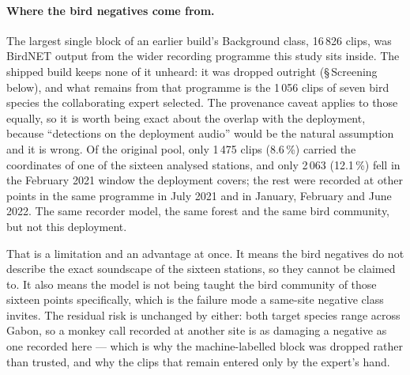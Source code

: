 \documentclass[review,3p,times]{elsarticle}
\begin{document}
\paragraph{Where the bird negatives come from.} The largest single block of an
earlier build's Background class, 16\,826 clips, was BirdNET output from the
wider recording programme this study sits inside. The shipped build keeps none
of it unheard: it was dropped outright (\S\,Screening below), and what remains
from that programme is the 1\,056 clips of seven bird species the collaborating
expert selected. The provenance caveat applies to those equally, so it is worth
being exact about the overlap with the deployment, because ``detections on the
deployment audio'' would be the natural assumption and it is wrong. Of the
original pool, only 1\,475 clips (8.6\,\%) carried
the coordinates of one of the sixteen analysed stations, and only 2\,063
(12.1\,\%) fell in the February 2021 window the deployment covers; the rest were
recorded at other points in the same programme in July 2021 and in January,
February and June 2022. The same recorder model, the same forest and
the same bird community, but not this deployment.

That is a limitation and an advantage at once. It means the bird negatives do
not describe the exact soundscape of the sixteen stations, so they cannot be
claimed to. It also means the model is not being taught the bird community of
those sixteen points specifically, which is the failure mode a same-site
negative class invites. The residual risk is unchanged by either: both target
species range across Gabon, so a monkey call recorded at another site is as
damaging a negative as one recorded here --- which is why the machine-labelled
block was dropped rather than trusted, and why the clips that remain entered
only by the expert's hand.
\end{document}
